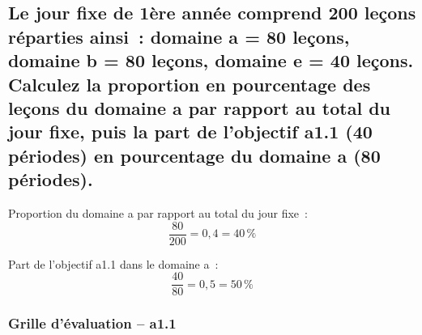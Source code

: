 \documentclass[a4paper,12pt,answers,addpoints]{exam}
\begin{document}
\begin{questions}
\begin{parts}
		\end{parts}
		
		
		\begin{parts}
			
			\part[2]{Le jour fixe de 1ère année comprend 200 leçons réparties ainsi~: domaine a = 80 leçons, domaine b = 80 leçons, domaine e = 40 leçons. Calculez la proportion en pourcentage des leçons du domaine a par rapport au total du jour fixe, puis la part de l'objectif a1.1 (40 périodes) en pourcentage du domaine a (80 périodes).}
			\begin{solution}
				Proportion du domaine a par rapport au total du jour fixe~:
				$$\dfrac{80}{200} = 0{,}4 = 40\,\%$$
				
				Part de l'objectif a1.1 dans le domaine a~:
				$$\dfrac{40}{80} = 0{,}5 = 50\,\%$$
			\end{solution}
			
		\end{parts}
		
	\end{questions}
	
	\newpage
	
	\section*{Grille d'évaluation -- a1.1 }
	
\end{document}
